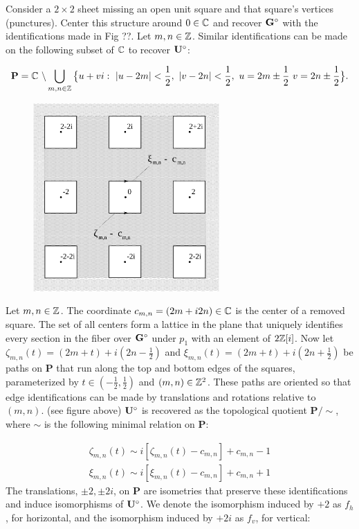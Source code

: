 \documentclass[a4paper, 11pt]{article}
\begin{document}
Consider a $2\times2$ sheet missing an open unit square and that square's vertices (punctures). Center this structure around $0\in\mathbb{C}$ and recover $\mathbf{G}^\circ$ with the identifications made in Fig ??. Let $m,n\in\mathbb{Z}$. Similar identifications can be made on the following subset of $\mathbb{C}$ to recover $\mathbf{U}^\circ$:

\begin{equation}
\label{eq:P}
\mathbf{P} = \mathbb{C}\text{ }\backslash\bigcup_{m,n \in {\mathbb Z}} \big{\{} u+vi:~|u-2m|<\frac{1}{2},~|v-2n|<\frac{1}{2},~u=2m\pm\frac{1}{2}~v=2n\pm\frac{1}{2} \big{\}}.
\end{equation}

\begin{figure}[H]
\centering
\includegraphics[width=2.8in]{P.png}
\end{figure}
\noindent Let $m,n\in\mathbb{Z}$. The coordinate $c_{m,n}=(2m+i2n)\in\mathbb{C}$ is the center of a removed square. The set of all centers form a lattice in the plane that uniquely identifies every section in the fiber over $\mathbf{G}^\circ$ under $p_1$ with an element of $2\mathbb{Z}[i]$. Now let $\zeta_{m,n}(t)=(2m+t)+i(2n-\frac{1}{2})$ and 
$\xi_{m,n}(t)=(2m+t)+i(2n+\frac{1}{2})$ be paths on $\mathbf{P}$ that run along the top and bottom edges of the squares, parameterized by $t\in (-\frac{1}{2},\frac{1}{2})$ and $(m,n)\in\mathbb{Z}^2$. These paths are oriented so that edge identifications can be made by translations and rotations relative to $(m,n)$. (see figure above) $\mathbf{U}^\circ$ is recovered as the topological quotient $\mathbf{P}/\sim$, where $\sim$ is the following minimal relation on $\mathbf{P}$:

\begin{equation}
\begin{split}
\zeta_{m,n}(t)\sim i[\zeta_{m,n}(t)-c_{m,n}]+c_{m,n}-1\\
\xi_{m,n}(t)\sim i[\xi_{m,n}(t)-c_{m,n}]+c_{m,n}+1
\label{eq:rel2}
\end{split}
\end{equation}
The translations, $\pm 2,\pm 2i$, on $\mathbf{P}$ are isometries that preserve these identifications and induce isomorphisms of $\mathbf{U}^\circ$. We denote the isomorphism induced by $+2$ as $f_h$, for horizontal, and the isomorphism induced by $+2i$ as $f_v$, for vertical:
\end{document}
